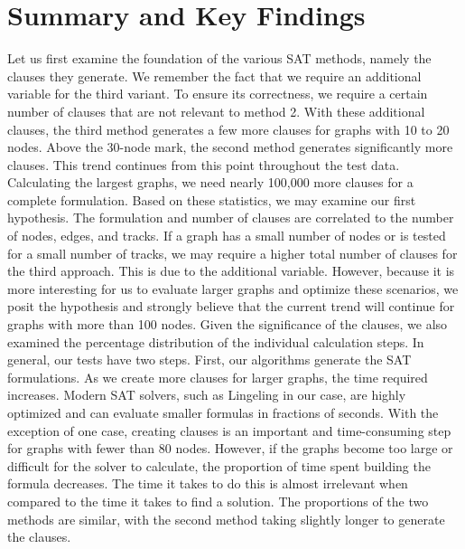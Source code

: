 \documentclass[bachelor, english]{algothesis}
\begin{document}
\section{Summary and Key Findings}
Let us first examine the foundation of the various SAT methods, namely the clauses they generate. We remember the fact that we require an additional variable for the third variant. To ensure its correctness, we require a certain number of clauses that are not relevant to method 2. With these additional clauses, the third method generates a few more clauses for graphs with 10 to 20 nodes. Above the 30-node mark, the second method generates significantly more clauses. This trend continues from this point throughout the test data. \newline
Calculating the largest graphs, we need nearly 100,000 more clauses for a complete formulation. Based on these statistics, we may examine our first hypothesis. The formulation and number of clauses are correlated to the number of nodes, edges, and tracks. If a graph has a small number of nodes or is tested for a small number of tracks, we may require a higher total number of clauses for the third approach. This is due to the additional variable. However, because it is more interesting for us to evaluate larger graphs and optimize these scenarios, we posit the hypothesis and strongly believe that the current trend will continue for graphs with more than 100 nodes. \newline
Given the significance of the clauses, we also examined the percentage distribution of the individual calculation steps. In general, our tests have two steps. First, our algorithms generate the SAT formulations. As we create more clauses for larger graphs, the time required increases. Modern SAT solvers, such as Lingeling in our case, are highly optimized and can evaluate smaller formulas in fractions of seconds. With the exception of one case, creating clauses is an important and time-consuming step for graphs with fewer than 80 nodes. However, if the graphs become too large or difficult for the solver to calculate, the proportion of time spent building the formula decreases. The time it takes to do this is almost irrelevant when compared to the time it takes to find a solution. The proportions of the two methods are similar, with the second method taking slightly longer to generate the clauses. 
\newline
\end{document}
